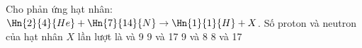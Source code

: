 \begin{vidu}%
 Cho phản ứng hạt nhân: $\Hn{2}{4}{He}+\Hn{7}{14}{N} \to \Hn{1}{1}{H}+X$. Số proton và neutron của hạt nhân $X$ lần lượt là 	
\choice
{ và 9}
{9 và 17}
{9 và 8}
{8 và 17}
\end{vidu}

